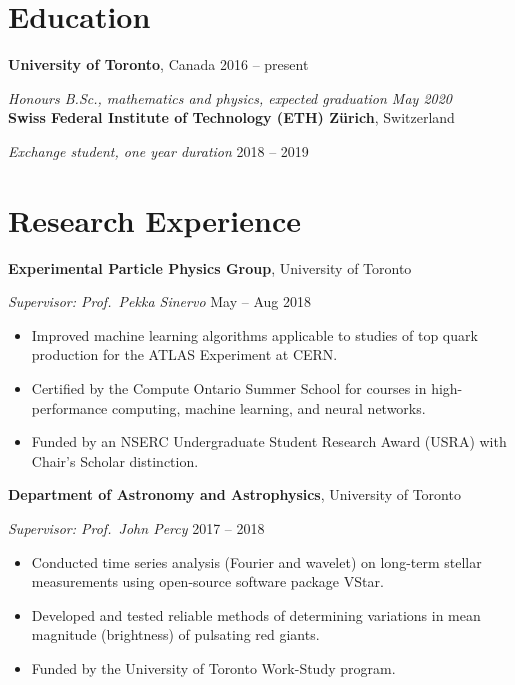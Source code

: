 \documentclass[letterpaper, 11pt]{aq-cv}
\begin{document}
\section*{Education}

\textbf{University of Toronto}, Canada \hfill 2016 -- present

\textsl{Honours B.Sc., mathematics and physics, expected graduation May 2020} \\[1ex]
\textbf{Swiss Federal Institute of Technology (ETH) Z\"{u}rich}, Switzerland

\textsl{Exchange student, one year duration} \hfill 2018 -- 2019

\section*{Research Experience}

\textbf{Experimental Particle Physics Group}, University of Toronto

\textsl{Supervisor: Prof.\ Pekka Sinervo} \hfill May -- Aug 2018
\begin{itemize}[noitemsep, topsep=0ex]
    \item Improved machine learning algorithms applicable to studies of top quark production for the ATLAS Experiment at CERN.

    \item Certified by the Compute Ontario Summer School for courses in high-performance computing, machine learning, and neural networks.

    \item Funded by an NSERC Undergraduate Student Research Award (USRA) with Chair's Scholar distinction.
\end{itemize}\vspace{1ex}
\textbf{Department of Astronomy and Astrophysics}, University of Toronto

\textsl{Supervisor: Prof.\ John Percy} \hfill 2017 -- 2018
\begin{itemize}[noitemsep, topsep=0ex]
    \item Conducted time series analysis (Fourier and wavelet) on long-term stellar measurements using open-source software package VStar.

    \item Developed and tested reliable methods of determining variations in mean magnitude (brightness) of pulsating red giants.

    \item Funded by the University of Toronto Work-Study program.
\end{itemize}
\end{document}
